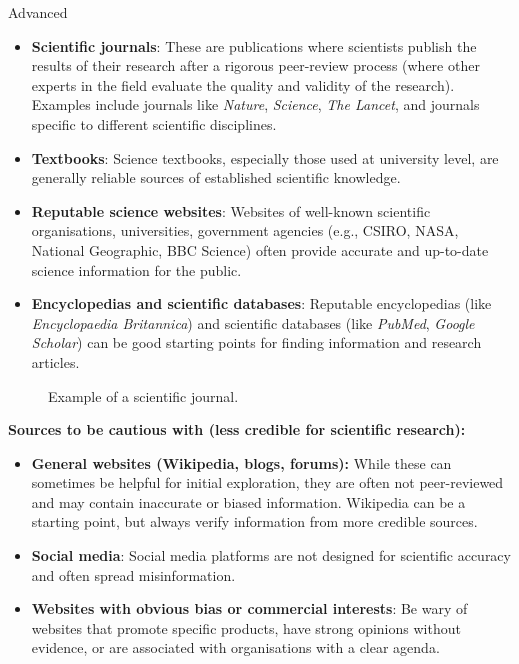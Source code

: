 \begin{tieredquestions}{Advanced}
\begin{itemize}
    \item \textbf{Scientific journals}: These are publications where scientists publish the results of their research after a rigorous peer-review process (where other experts in the field evaluate the quality and validity of the research).  Examples include journals like \textit{Nature}, \textit{Science}, \textit{The Lancet}, and journals specific to different scientific disciplines.
    \item \textbf{Textbooks}:  Science textbooks, especially those used at university level, are generally reliable sources of established scientific knowledge.
    \item \textbf{Reputable science websites}: Websites of well-known scientific organisations, universities, government agencies (e.g., CSIRO, NASA, National Geographic, BBC Science) often provide accurate and up-to-date science information for the public.
    \item \textbf{Encyclopedias and scientific databases}:  Reputable encyclopedias (like \textit{Encyclopaedia Britannica}) and scientific databases (like \textit{PubMed}, \textit{Google Scholar}) can be good starting points for finding information and research articles.
\end{itemize}

\begin{figure}
\centering
{}
\caption{Example of a scientific journal.}
\end{figure}


\textbf{Sources to be cautious with (less credible for scientific research):}

\begin{itemize}
    \item \textbf{General websites (Wikipedia, blogs, forums):} While these can sometimes be helpful for initial exploration, they are often not peer-reviewed and may contain inaccurate or biased information.  Wikipedia can be a starting point, but always verify information from more credible sources.
    \item \textbf{Social media}: Social media platforms are not designed for scientific accuracy and often spread misinformation.
    \item \textbf{Websites with obvious bias or commercial interests}: Be wary of websites that promote specific products, have strong opinions without evidence, or are associated with organisations with a clear agenda.
\end{itemize}


\end{tieredquestions}
